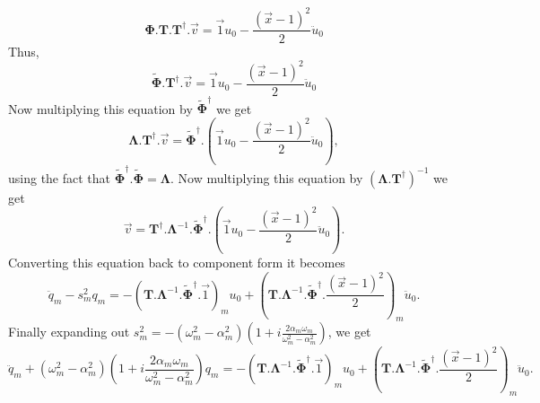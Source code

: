 \documentclass[superscriptaddress, onecolumn, prl]{revtex4}
\begin{document}
\begin{equation}
\label{eq:matrix_eq2}
\boldsymbol{\Phi}.\boldsymbol{T}.\boldsymbol{T^\dagger}.\vec{v} = \vec{1} u_0 - \frac{(\vec{x}-1)^2}{2} \ddot{u}_0
\end{equation}
Thus,
\begin{equation}
\label{eq:matrix_eq3}
\widetilde{\boldsymbol{\Phi}}.\boldsymbol{T^\dagger}.\vec{v} = \vec{1} u_0 - \frac{(\vec{x}-1)^2}{2} \ddot{u}_0
\end{equation}
Now multiplying this equation by $\widetilde{\boldsymbol{\Phi}}^\dagger$ we get
\begin{equation}
\label{eq:matrix_eq4}
\boldsymbol{\Lambda}.\boldsymbol{T^\dagger}.\vec{v} = \widetilde{\boldsymbol{\Phi}}^\dagger. \left( \vec{1} u_0 - \frac{(\vec{x}-1)^2}{2} \ddot{u}_0 \right),
\end{equation}
using the fact that $\widetilde{\boldsymbol{\Phi}}^\dagger.\widetilde{\boldsymbol{\Phi}}=\boldsymbol{\Lambda}$. Now multiplying this equation by $(\boldsymbol{\Lambda}.\boldsymbol{T^\dagger})^{-1}$ we get  
\begin{equation}
\label{eq:matrix_eq4}
\vec{v} = \boldsymbol{T^\dagger}.\boldsymbol{\Lambda}^{-1}.\widetilde{\boldsymbol{\Phi}}^\dagger. \left( \vec{1} u_0 - \frac{(\vec{x}-1)^2}{2} \ddot{u}_0 \right).
\end{equation}
Converting this equation back to component form it becomes
\begin{equation}
\label{eq:non_zero_dissipation}
\ddot{q}_m - s_m^2 q_m = -(\boldsymbol{T}.\boldsymbol{\Lambda}^{-1}.\widetilde{\boldsymbol{\Phi}}^\dagger.\vec{1})_m u_0 + (\boldsymbol{T}.\boldsymbol{\Lambda}^{-1}.\widetilde{\boldsymbol{\Phi}}^\dagger.\frac{(\vec{x}-1)^2}{2})_m \ddot{u}_0.
\end{equation}
Finally expanding out $s_m^2=-(\omega_m^2 - \alpha_m^2) \left( 1 +  i \frac{2 \alpha_m \omega_m}{\omega_m^2 - \alpha_m^2} \right)$, we get
\begin{equation}
\label{eq:hysteretic_damping}
\ddot{q}_m + (\omega_m^2 - \alpha_m^2) \left( 1 +  i \frac{2 \alpha_m \omega_m}{\omega_m^2 - \alpha_m^2} \right) q_m = -(\boldsymbol{T}.\boldsymbol{\Lambda}^{-1}.\widetilde{\boldsymbol{\Phi}}^\dagger.\vec{1})_m u_0 + (\boldsymbol{T}.\boldsymbol{\Lambda}^{-1}.\widetilde{\boldsymbol{\Phi}}^\dagger.\frac{(\vec{x}-1)^2}{2})_m \ddot{u}_0.
\end{equation}
\end{document}
